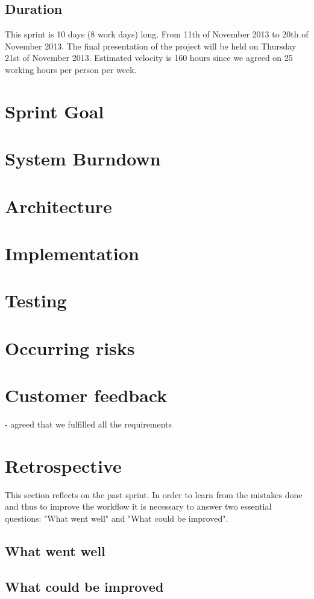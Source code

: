 \subsection{Duration}
This sprint is 10 days (8 work days) long. From 11th of November 2013 to 20th of November 2013. The final presentation of the project will be held on Thursday 21st of November 2013.
Estimated velocity is 160 hours since we agreed on 25 working hours per person per week. 

\section{Sprint Goal}

\section{System Burndown}

\section{Architecture}
\section{Implementation}
\section{Testing}
\section{Occurring risks}
\section{Customer feedback}
- agreed that we fulfilled all the requirements

\section{Retrospective}
This section reflects on the past sprint. In order to learn from the mistakes done and thus to improve the workflow it is necessary to answer two essential questions: "What went well" and "What could be improved".

\subsection{What went well}
\subsection{What could be improved}
